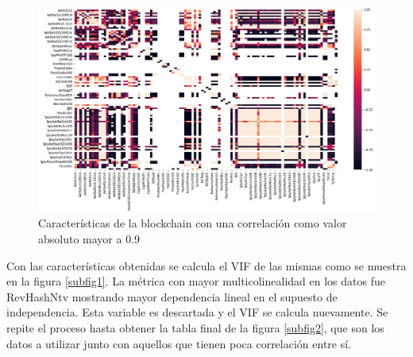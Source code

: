 \begin{figure}[!h]
	\centering
	\includegraphics[scale=0.4]{Chapter5/corr_map2.png}
	\caption{Características de la blockchain con una correlación como valor absoluto mayor a 0.9}
	\label{fig7}
\end{figure}

Con las características obtenidas se calcula el VIF de las mismas como se muestra en la figura \autoref{subfig1}. La métrica con mayor multicolinealidad en los datos fue RevHashNtv mostrando mayor dependencia lineal en el supuesto de independencia. Esta variable es descartada y el VIF se calcula nuevamente. Se repite el proceso hasta obtener la tabla final de la figura \autoref{subfig2}, que son los datos a utilizar junto con aquellos que tienen poca correlación entre sí.

